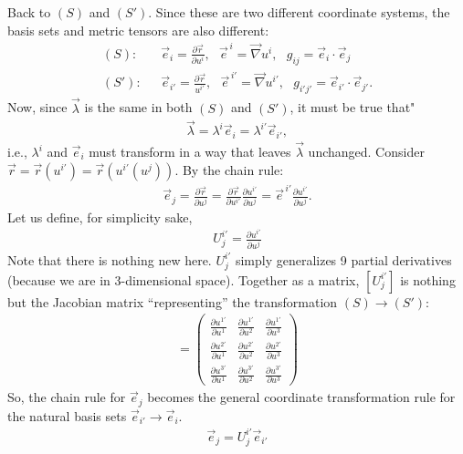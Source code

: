 \documentclass{book}
\theoremstyle{definition}
\begin{document}
Back to $(S)$ and $(S')$. Since these are two different coordinate systems, the basis sets and metric tensors are also different:
\begin{align*}
(S): &\text{ }\vec{e}_i = \frac{\partial \vec{r}}{\partial u^i}, \text{ }\vec{e}^{\,i} = \vec{\nabla}u^i, \text{ }g_{ij} = \vec{e}_i\cdot\vec{e}_j\\
(S'): &\text{ }\vec{e}_{i'} = \frac{\partial \vec{r}}{u^{i'}}, \text{ }\vec{e}^{\,i'} = \vec{\nabla} u^{i'}, \text{ }g_{i'j'} = \vec{e}_{i'}\cdot\vec{e}_{j'}.
\end{align*}
Now, since $\vec{\lambda}$ is the same in both $(S)$ and $(S')$, it must be true that"
\begin{align*}
\vec{\lambda} = \lambda^i\vec{e}_i = \lambda^{i'}\vec{e}_{i'},
\end{align*}
i.e., $\lambda^i$ and $\vec{e}_i$ must transform in a way that leaves $\vec{\lambda}$ unchanged. Consider $\vec{r} = \vec{r}(u^{i'}) = \vec{r}(u^{i'}(u^j))$. By the chain rule:
\begin{align*}
\vec{e}_j = \frac{\partial \vec{r}}{\partial u^j} = \frac{\partial \vec{r}}{\partial u^{i'}}\frac{\partial u^{i'}}{\partial u^j} = \vec{e}^{\,i'}\frac{\partial u^{i'}}{\partial u^j}.
\end{align*}
Let us define, for simplicity sake,
\begin{align*}
\boxed{U^{i'}_j = \frac{\partial u^{i'}}{\partial u^j}}
\end{align*}
Note that there is nothing new here. $U^{i'}_j$ simply generalizes 9 partial derivatives (because we are in 3-dimensional space). Together as a matrix, $[U^{i'}_j]$ is nothing but the Jacobian matrix ``representing'' the transformation $(S) \rightarrow (S')$:
\begin{align*}
[U^{i'}_j] = 
\begin{pmatrix}
\frac{\partial u^{1'}}{\partial u^1} & \frac{\partial u^{1'}}{\partial u^2} & \frac{\partial u^{1'}}{\partial u^3}\\
\frac{\partial u^{2'}}{\partial u^1} & \frac{\partial u^{2'}}{\partial u^2} & \frac{\partial u^{2'}}{\partial u^3}\\
\frac{\partial u^{3'}}{\partial u^1} & \frac{\partial u^{3'}}{\partial u^2} & \frac{\partial u^{3'}}{\partial u^3}
\end{pmatrix}
\end{align*}
So, the chain rule for $\vec{e}_j$ becomes the general coordinate transformation rule for the natural basis sets $\vec{e}_{i'} \rightarrow \vec{e}_i$. 
\begin{align*}
\boxed{\vec{e}_j = U^{i'}_j\vec{e}_{i'}}
\end{align*}
\end{document}
